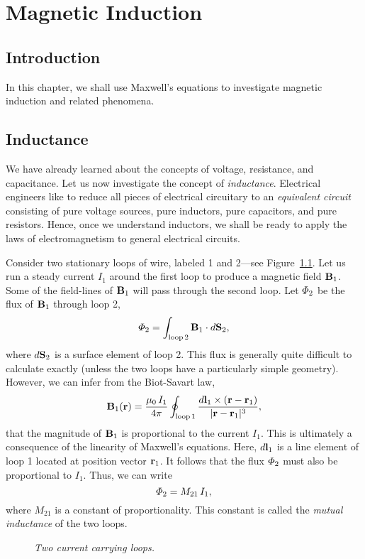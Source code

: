 \chapter{Magnetic Induction}\label{ind}
\section{Introduction}
In this chapter, we shall use Maxwell's equations to investigate
magnetic induction and related phenomena.

\section{Inductance}
We have already learned about the concepts of voltage, resistance, and capacitance. Let us now investigate the concept of {\em inductance}.
Electrical engineers like to reduce all pieces of electrical circuitary to an
{\em equivalent circuit}\/ consisting  of pure voltage sources,
pure inductors, pure capacitors, and pure resistors. Hence, once we understand inductors, we shall
be ready to apply the laws of electromagnetism to general electrical circuits. 

Consider two stationary loops of wire, labeled 1 and 2---see Figure~\ref{floop}. Let us run a steady current
$I_1$ around the first loop to produce a magnetic field ${\bf B}_1$. Some of the field-lines
of ${\bf B}_1$ will pass through the second loop. Let ${\mit\Phi}_2$ be the flux
of ${\bf B}_1$ through loop 2,
\begin{equation}
{\mit\Phi}_2 = \int_{\rm loop\, 2} {\bf B}_1\cdot d{\bf S}_2,
\end{equation}
where $d{\bf S}_2$ is a surface element of loop 2. 
This flux is generally quite difficult to calculate exactly (unless the two loops
have a particularly simple geometry). However, we can infer from the Biot-Savart law,
\begin{equation}
{\bf B}_1({\bf r}) = \frac{\mu_0 \,I_1}{4\pi} \oint_{\rm loop \,1} 
\frac{ d{\bf l}_1 \times ({\bf r} - {\bf r}_1)}{|{\bf r} - {\bf r}_1|^3},
\end{equation}
that the magnitude of ${\bf B}_1$ is proportional to the current $I_1$.
This is
ultimately a consequence of the linearity of Maxwell's equations. 
Here, $d{\bf l}_1$ is a line element of loop 1 located at position
vector ${\bf r}_1$.  
It follows that
the flux ${\mit\Phi}_2$ must also be proportional to $I_1$. Thus, we can write
\begin{equation}
{\mit\Phi}_2 = M_{21}\,I_1,
\end{equation}
where $M_{21}$ is a constant of proportionality. This constant is  called
the {\em mutual inductance}\/ of the two loops. 
\begin{figure}
\centerline{}
\caption{\em Two current carrying loops.}\label{floop}
\end{figure}

